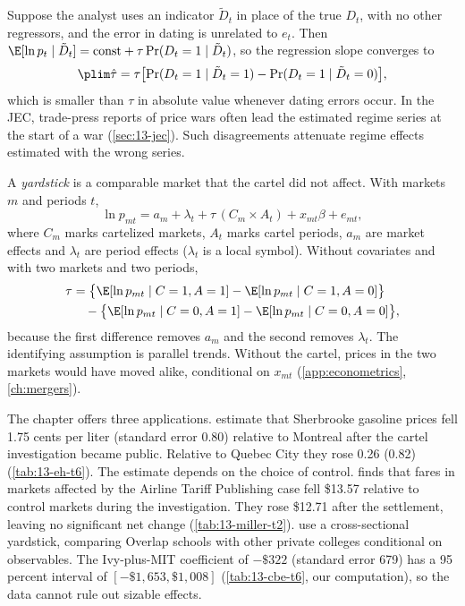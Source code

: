 \begin{remark}\label{rem:13-misclassification}
Suppose the analyst uses an indicator $\tilde D_t$ in place of the true $D_t$, with no other regressors, and the
error in dating is unrelated to $e_t$. Then $\E[\ln p_t \mid \tilde D_t] = \text{const} + \tau\Pr(D_t = 1 \mid \tilde
D_t)$, so the regression slope converges to
\begin{equation*}
  \plim \hat\tau = \tau\bigl[\Pr(D_t = 1 \mid \tilde D_t = 1) - \Pr(D_t = 1 \mid \tilde D_t = 0)\bigr] ,
\end{equation*}
which is smaller than $\tau$ in absolute value whenever dating errors occur. In the JEC, trade-press reports of price
wars often lead the estimated regime series at the start of a war (\cref{sec:13-jec}). Such disagreements attenuate
regime effects estimated with the wrong series.
\end{remark}

A \emph{yardstick} is a comparable market that the cartel did not affect. With markets $m$ and periods $t$,
\begin{equation}\label{eq:13-did}
  \ln p_{mt} = a_m + \lambda_t + \tau\,(C_m \times A_t) + x_{mt}\beta + e_{mt} ,
\end{equation}
where $C_m$ marks cartelized markets, $A_t$ marks cartel periods, $a_m$ are market effects and $\lambda_t$ are period
effects ($\lambda_t$ is a local symbol). Without covariates and with two markets and two periods,
\begin{align*}
  \tau &= \bigl\{\E[\ln p_{mt} \mid C=1, A=1] - \E[\ln p_{mt} \mid C=1, A=0]\bigr\}\\
       &\quad - \bigl\{\E[\ln p_{mt} \mid C=0, A=1] - \E[\ln p_{mt} \mid C=0, A=0]\bigr\},
\end{align*}
because the first difference removes $a_m$ and the second removes $\lambda_t$. The identifying assumption is
parallel trends. Without the cartel, prices in the two markets would have moved alike, conditional on $x_{mt}$
(\cref{app:econometrics}, \cref{ch:mergers}).

The chapter offers three applications. \citet{ErutkuHildebrand2010} estimate that Sherbrooke gasoline prices fell
1.75 cents per liter (standard error 0.80) relative to Montreal after the cartel investigation became public.
Relative to Quebec City they rose 0.26 (0.82) (\cref{tab:13-eh-t6}). The estimate depends on the choice of control.
\citet{Miller2010} finds that fares in markets affected by the Airline Tariff Publishing case fell \$13.57 relative
to control markets during the investigation. They rose \$12.71 after the settlement, leaving no significant net
change (\cref{tab:13-miller-t2}). \citet{CarltonBambergerEpstein1995} use a cross-sectional yardstick, comparing Overlap
schools with other private colleges conditional on observables. The Ivy-plus-MIT coefficient of $-\$322$ (standard
error 679) has a 95 percent interval of $[-\$1{,}653, \$1{,}008]$ (\cref{tab:13-cbe-t6}, our computation), so the
data cannot rule out sizable effects.

